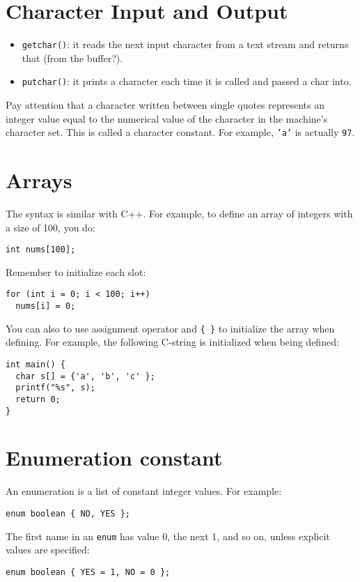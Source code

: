 \documentclass[12pt]{article}
\begin{document}
\section{Character Input and Output}
\label{sec:org1fd928a}
\begin{itemize}
\item \texttt{getchar()}: it reads the next input character from a text stream and returns that (from the buffer?).
\item \texttt{putchar()}: it prints a character each time it is called and passed a char into.
\end{itemize}

Pay attention that a character written between single quotes represents an integer value equal to the numerical value of the character in the machine's character set. This is called a character constant. For example, \texttt{'a'} is actually \texttt{97}.
\section{Arrays}
\label{sec:org1a090ff}
The syntax is similar with C++. For example, to define an array of integers with a size of 100, you do:
\begin{verbatim}
int nums[100];
\end{verbatim}
Remember to initialize each slot:
\begin{verbatim}
for (int i = 0; i < 100; i++)
  nums[i] = 0;
\end{verbatim}

You can also to use assignment operator and \texttt{\{ \}} to initialize the array when defining. For example, the following C-string is initialized when being defined:
\begin{verbatim}
int main() {
  char s[] = {'a', 'b', 'c' };
  printf("%s", s);
  return 0;
}
\end{verbatim}
\section{Enumeration constant}
\label{sec:orgfec9e5a}
An enumeration is a list of constant integer values. For example:
\begin{verbatim}
enum boolean { NO, YES };
\end{verbatim}
The first name in an \texttt{enum} has value 0, the next 1, and so on, unless explicit values are specified:
\begin{verbatim}
enum boolean { YES = 1, NO = 0 };
\end{verbatim}
\end{document}
